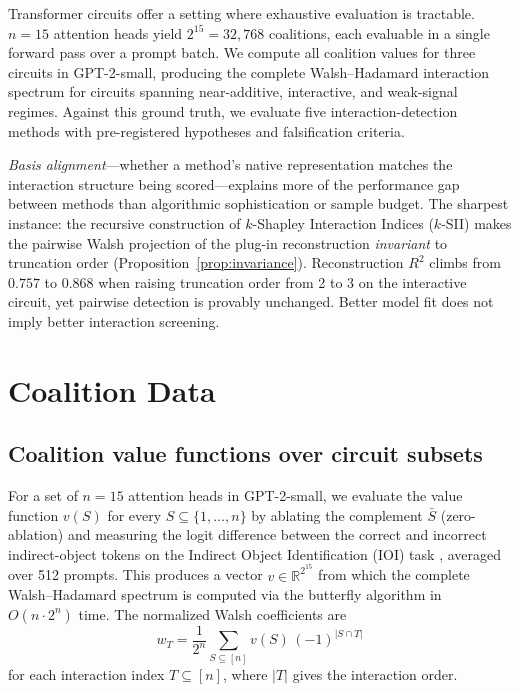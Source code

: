 \documentclass[10pt]{article}
\begin{document}
Transformer circuits offer a setting where exhaustive evaluation is
tractable. $n = 15$ attention heads yield $2^{15} = 32{,}768$
coalitions, each evaluable in a single forward pass over a prompt
batch. We compute all coalition values for three circuits in
GPT-2-small, producing the complete Walsh--Hadamard interaction
spectrum for circuits spanning near-additive, interactive, and
weak-signal regimes. Against this ground truth, we evaluate five
interaction-detection methods with pre-registered hypotheses and
falsification criteria.

\emph{Basis alignment}---whether a method's native representation
matches the interaction structure being scored---explains more of
the performance gap between methods than algorithmic sophistication
or sample budget.
The sharpest instance: the recursive construction of $k$-Shapley
Interaction Indices ($k$-SII) \citep{bordt2023shapley} makes the
pairwise Walsh projection of the plug-in reconstruction
\emph{invariant} to truncation order
(Proposition~\ref{prop:invariance}).
Reconstruction $R^2$ climbs from $0.757$ to $0.868$ when raising
truncation order from 2 to 3 on the interactive circuit, yet
pairwise detection is provably unchanged.
Better model fit does not imply better interaction screening.


\section{Coalition Data}
\label{sec:ground-truth}

\subsection{Coalition value functions over circuit subsets}

For a set of $n = 15$ attention heads in GPT-2-small, we evaluate
the value function $v(S)$ for every $S \subseteq \{1, \ldots, n\}$
by ablating the complement $\bar{S}$ (zero-ablation) and measuring
the logit difference between the correct and incorrect indirect-object
tokens on the Indirect Object Identification (IOI) task
\citep{wang2022interpretability}, averaged over 512 prompts. This
produces a vector $v \in \mathbb{R}^{2^{15}}$ from which the
complete Walsh--Hadamard spectrum is computed via the butterfly
algorithm in $O(n \cdot 2^n)$ time. The normalized Walsh coefficients
are
\[
  w_T = \frac{1}{2^n} \sum_{S \subseteq [n]} v(S) \,(-1)^{|S \cap T|}
\]
for each interaction index $T \subseteq [n]$, where $|T|$ gives the
interaction order.
\end{document}
